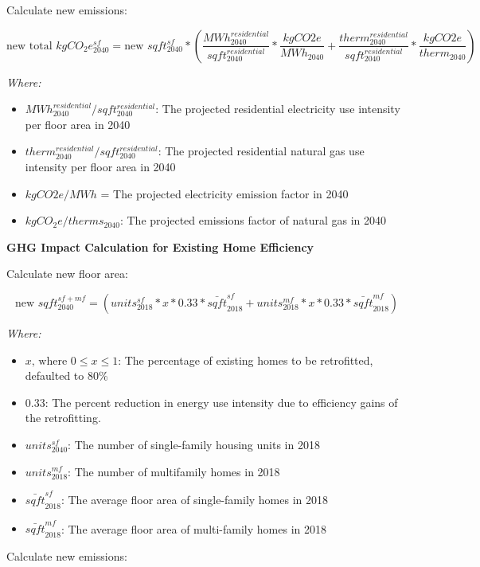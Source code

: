 \documentclass[
]{book}
\providecommand{\tightlist}{%
  \setlength{\itemsep}{0pt}\setlength{\parskip}{0pt}}
\begin{document}
Calculate new emissions:

\[\text{new total }kgCO_2e^{sf}_{2040} = \text{new }sqft_{2040}^{sf} * \left( \frac{MWh_{2040}^{residential}}{sqft_{2040}^{residential}} * \frac{kgCO2e}{MWh_{2040}} + \frac{therm_{2040}^{residential}}{sqft_{2040}^{residential}} * \frac{kgCO2e}{therm_{2040}} \right)\]

\emph{Where:}

\begin{itemize}
\tightlist
\item
  \(MWh_{2040}^{residential}/sqft_{2040}^{residential}\): The projected residential electricity use intensity per floor area in 2040
\item
  \(therm_{2040}^{residential}/sqft_{2040}^{residential}\): The projected residential natural gas use intensity per floor area in 2040
\item
  \(kgCO2e/MWh\) = The projected electricity emission factor in 2040
\item
  \(kgCO_2e/therms_{2040}\): The projected emissions factor of natural gas in 2040
\end{itemize}

\textbf{GHG Impact Calculation for Existing Home Efficiency}

Calculate new floor area:

\[\text{new }sqft_{2040}^{sf+mf} = (units_{2018}^{sf} * x * 0.33 * \bar{sqft}_{2018}^{sf} + units_{2018}^{mf} * x * 0.33 * \bar{sqft}_{2018}^{mf})\]

\emph{Where:}

\begin{itemize}
\tightlist
\item
  \(x \text{, where } 0 \le x \le 1\): The percentage of existing homes to be retrofitted, defaulted to 80\%
\item
  \(0.33\): The percent reduction in energy use intensity due to efficiency gains of the retrofitting.
\item
  \(units_{2040}^{sf}\): The number of single-family housing units in 2018
\item
  \(units_{2018}^{mf}\): The number of multifamily homes in 2018
\item
  \(\bar{sqft}_{2018}^{sf}\): The average floor area of single-family homes in 2018
\item
  \(\bar{sqft}_{2018}^{mf}\): The average floor area of multi-family homes in 2018
\end{itemize}

Calculate new emissions:
\end{document}

